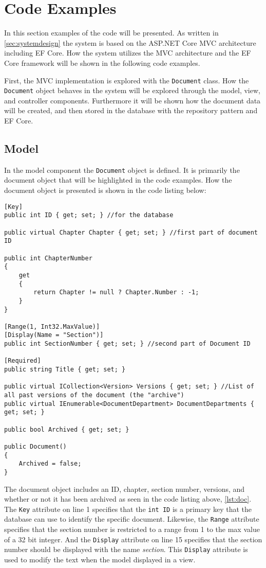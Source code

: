 \documentclass[../../master.tex]{subfiles}
\begin{document}
\section{Code Examples}\label{sec:codeexamples}
In this section examples of the code will be presented.
As written in \cref{sec:systemdesign} the system is based on the ASP.NET Core MVC architecture including EF Core.
How the system utilizes the MVC architecture and the EF Core framework will be shown in the following code examples.

First, the MVC implementation is explored with the \texttt{Document} class.
How the \texttt{Document} object behaves in the system will be explored through the model, view, and controller components.
Furthermore it will be shown how the document data will be created, and then stored in the database with the repository pattern and EF Core.

\subsection{Model}

In the model component the \texttt{Document} object is defined.
It is primarily the document object that will be highlighted in the code examples.
How the document object is presented is shown in the code listing below:

\newpage
\begin{lstlisting}[caption={Document model code}, label={lst:doc}]
[Key]
public int ID { get; set; } //for the database

public virtual Chapter Chapter { get; set; } //first part of document ID

public int ChapterNumber
{
	get
	{
		return Chapter != null ? Chapter.Number : -1;
	}
}

[Range(1, Int32.MaxValue)]
[Display(Name = "Section")]
public int SectionNumber { get; set; } //second part of Document ID

[Required]
public string Title { get; set; }

public virtual ICollection<Version> Versions { get; set; } //List of all past versions of the document (the "archive")
public virtual IEnumerable<DocumentDepartment> DocumentDepartments { get; set; }

public bool Archived { get; set; }

public Document()
{
	Archived = false;
}
\end{lstlisting}

The document object includes an ID, chapter, section number, versions, and whether or not it has been archived as seen in the code listing above, \cref{lst:doc}.
The \texttt{Key} attribute on line 1 specifies that the \texttt{int ID} is a primary key that the database can use to identify the specific document.
Likewise, the \texttt{Range} attribute specifies that the section number is restricted to a range from 1 to the max value of a 32 bit integer.
And the \texttt{Display} attribute on line 15 specifies that the section number should be displayed with the name \textit{section}.
This \texttt{Display} attribute is used to modify the text when the model displayed in a view.
\end{document}
